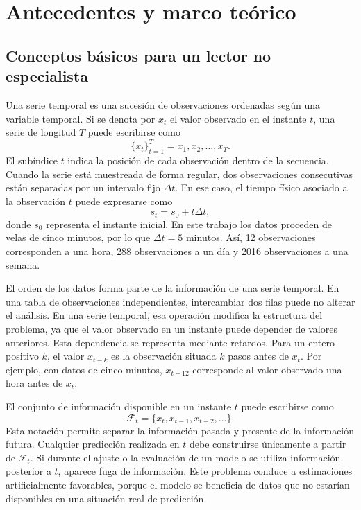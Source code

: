 
\chapter{Antecedentes y marco teórico}\label{cap:antecedentes}

\section{Conceptos básicos para un lector no especialista}\label{sec:conceptos-basicos}

Una serie temporal es una sucesión de observaciones ordenadas según una variable temporal. Si se denota por \(x_t\) el valor observado en el instante \(t\), una serie de longitud \(T\) puede escribirse como
\begin{equation}
    \{x_t\}_{t=1}^{T} = x_1, x_2, \ldots, x_T.
\end{equation}
El subíndice \(t\) indica la posición de cada observación dentro de la secuencia. Cuando la serie está muestreada de forma regular, dos observaciones consecutivas están separadas por un intervalo fijo \(\Delta t\). En ese caso, el tiempo físico asociado a la observación \(t\) puede expresarse como
\begin{equation}
    s_t = s_0 + t\Delta t,
\end{equation}
donde \(s_0\) representa el instante inicial. En este trabajo los datos proceden de velas de cinco minutos, por lo que \(\Delta t = 5\) minutos. Así, 12 observaciones corresponden a una hora, 288 observaciones a un día y 2016 observaciones a una semana.

El orden de los datos forma parte de la información de una serie temporal. En una tabla de observaciones independientes, intercambiar dos filas puede no alterar el análisis. En una serie temporal, esa operación modifica la estructura del problema, ya que el valor observado en un instante puede depender de valores anteriores. Esta dependencia se representa mediante retardos. Para un entero positivo \(k\), el valor \(x_{t-k}\) es la observación situada \(k\) pasos antes de \(x_t\). Por ejemplo, con datos de cinco minutos, \(x_{t-12}\) corresponde al valor observado una hora antes de \(x_t\).

El conjunto de información disponible en un instante \(t\) puede escribirse como
\begin{equation}
    \mathcal{F}_t = \{x_t, x_{t-1}, x_{t-2}, \ldots\}.
\end{equation}
Esta notación permite separar la información pasada y presente de la información futura. Cualquier predicción realizada en \(t\) debe construirse únicamente a partir de \(\mathcal{F}_t\). Si durante el ajuste o la evaluación de un modelo se utiliza información posterior a \(t\), aparece fuga de información. Este problema conduce a estimaciones artificialmente favorables, porque el modelo se beneficia de datos que no estarían disponibles en una situación real de predicción.

